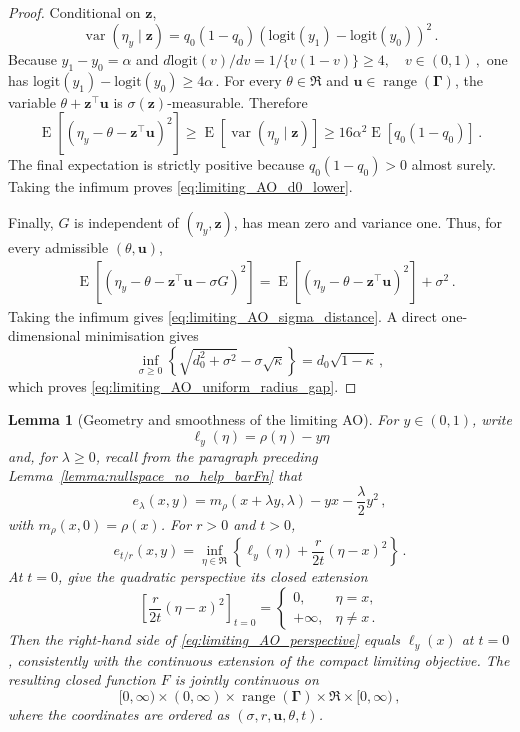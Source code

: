 \documentclass{article}
\DeclareMathOperator{\expect}{E}
\DeclareMathOperator{\var}{var}
\newtheorem{lemma}{Lemma}
\theoremstyle{definition}
\newcommand*{\bb}{\boldsymbol}
\newcommand{\logit}[1]{\ensuremath{\textrm{logit}(#1)}}
\def\bu{\bb{u}}
\def\bz{\bb{z}}
\newcommand{\range}{\operatorname{range}}
\begin{document}
\begin{bibunit}
\begin{proof}
Conditional on $\bz$,
$$
    \var(\eta_y\mid\bz)
    =
    q_0(1-q_0)
    \left(
        \logit{y_1}-\logit{y_0}
    \right)^2\,.
$$
Because $y_1-y_0=\alpha$ and $d\logit{v}/dv = 1/\{v(1-v)\} \geq4, \quad v\in(0,1)\,,$
one has $\logit{y_1}-\logit{y_0} \geq4\alpha\,.$
For every $\theta\in\Re$ and
$\bu\in\range(\bb\Gamma)$, the variable
$\theta+\bz^\top\bu$ is $\sigma(\bz)$-measurable. Therefore
$$
	\expect\left[ \left( \eta_y-\theta-\bz^\top\bu \right)^2 \right] \geq \expect[\var(\eta_y\mid\bz)] \geq 16\alpha^2\expect[q_0(1-q_0)]\,.
$$
The final expectation is strictly positive because
$q_0(1-q_0)>0$ almost surely. Taking the infimum proves
\eqref{eq:limiting_AO_d0_lower}.

Finally, $G$ is independent of $(\eta_y,\bz)$, has mean zero and variance
one. Thus, for every admissible $(\theta,\bu)$,
$$
    \begin{aligned}
    &\expect\left[
        \left(
            \eta_y-\theta-\bz^\top\bu-\sigma G
        \right)^2
    \right]=
    \expect\left[
        \left(
            \eta_y-\theta-\bz^\top\bu
        \right)^2
    \right]
    +\sigma^2\,.
    \end{aligned}
$$
Taking the infimum gives \eqref{eq:limiting_AO_sigma_distance}. A direct
one-dimensional minimisation gives
$$
    \inf_{\sigma\geq0}
    \left
    \{
        \sqrt{d_0^2+\sigma^2}
        -\sigma\sqrt\kappa
    \right\}
    =
    d_0\sqrt{1-\kappa}\,,
$$
which proves \eqref{eq:limiting_AO_uniform_radius_gap}.
\end{proof}

\begin{lemma}[Geometry and smoothness of the limiting AO]
\label{lemma:limiting_AO_geometry}
For $y\in(0,1)$, write
$$
    \ell_y(\eta)
    =
    \rho(\eta)-y\eta
$$
and, for $\lambda\geq0$, recall from the paragraph preceding Lemma~\ref{lemma:nullspace_no_help_barFn} that
$$
    e_\lambda(x,y)
    =
    m_\rho(x+\lambda y,\lambda)
    -
    yx
    -
    \frac{\lambda}{2}y^2\,,
$$
with $m_\rho(x,0)=\rho(x)$. For $r>0$ and $t>0$,
\begin{equation}
\label{eq:limiting_AO_perspective}
    e_{t/r}(x,y)
    =
    \underset{\eta\in\Re}{\inf}
    \left\{
        \ell_y(\eta)
        +\frac{r}{2t}(\eta-x)^2
    \right\}\,.
\end{equation}
At $t=0$, give the quadratic perspective its closed extension
$$
    \left[
        \frac{r}{2t}(\eta-x)^2
    \right]_{t=0}
    =
    \begin{cases}
        0,&\eta=x,\\
        +\infty,&\eta\neq x\,.
    \end{cases}
$$
Then the right-hand side of \eqref{eq:limiting_AO_perspective} equals
$\ell_y(x)$ at $t=0$, consistently with the continuous extension of the
compact limiting objective. The resulting closed function $F$ is jointly
continuous on
$$
    [0,\infty)
    \times(0,\infty)
    \times\range(\bb\Gamma)
    \times\Re
    \times[0,\infty)\,,
$$
where the coordinates are ordered as $(\sigma,r,\bu,\theta,t)$.


\end{lemma}
\end{bibunit}
\end{document}
